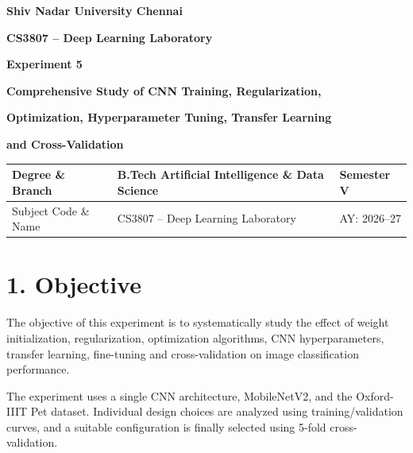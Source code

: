 \documentclass[10pt]{article}
\begin{document}

\begin{center}

{\large\textbf{Shiv Nadar University Chennai}}

\vspace{2mm}

{\normalsize\textbf{CS3807 -- Deep Learning Laboratory}}

\vspace{2mm}

{\large\textbf{Experiment 5}}

\vspace{1mm}

{\normalsize\textbf{Comprehensive Study of CNN Training, Regularization,}}

{\normalsize\textbf{Optimization, Hyperparameter Tuning, Transfer Learning}}

{\normalsize\textbf{and Cross-Validation}}

\end{center}

\vspace{3mm}

\begin{tabular}{|p{3.4cm}|p{9.0cm}|p{1.4cm}|}
\hline
Degree \& Branch &
B.Tech Artificial Intelligence \& Data Science &
Semester V\\
\hline
Subject Code \& Name &
CS3807 -- Deep Learning Laboratory &
AY: 2026--27\\
\hline
\end{tabular}

\section*{1. Objective}

The objective of this experiment is to systematically study the effect of
weight initialization, regularization, optimization algorithms, CNN
hyperparameters, transfer learning, fine-tuning and cross-validation on
image classification performance.

The experiment uses a single CNN architecture, MobileNetV2, and the
Oxford-IIIT Pet dataset. Individual design choices are analyzed using
training/validation curves, and a suitable configuration is finally
selected using 5-fold cross-validation.
\end{document}
